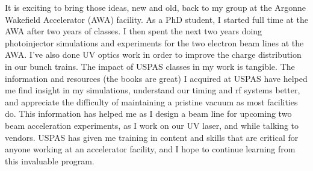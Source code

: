 \documentclass[11pt,a4paper,sans]{moderncv}        %
\begin{document}
It is exciting to bring those ideas, new and old, back to my group at the 
Argonne Wakefield Accelerator (AWA) facility. As a PhD student, I started full time at the AWA 
after two years of classes. I then spent the next two years doing photoinjector 
simulations and experiments for the two electron beam lines at the AWA. 
I've also done UV optics work in order to improve the charge distribution in our bunch trains. 
The impact of USPAS classes in my work is tangible. The information and resources (the books are great) 
I acquired at USPAS have helped me find insight in my simulations, understand our timing and rf systems better, 
and appreciate the difficulty of maintaining a pristine vacuum as most facilities do. This information has helped me 
as I design a beam line for upcoming two beam acceleration experiments, as I work on our UV laser, and while
talking to vendors. USPAS has given me training in content and skills that are critical for anyone working
at an accelerator facility, and I hope to continue learning from this invaluable program.

\makeletterclosing

\end{document}
